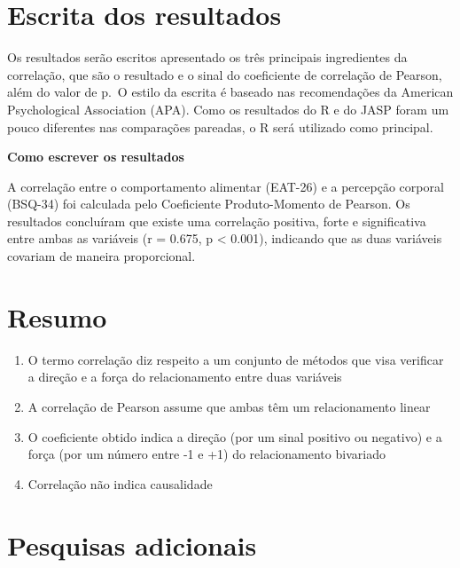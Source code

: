 \documentclass[
]{book}
\providecommand{\tightlist}{%
  \setlength{\itemsep}{0pt}\setlength{\parskip}{0pt}}
\begin{document}
\hypertarget{escrita-dos-resultados-12}{%
\section{Escrita dos resultados}\label{escrita-dos-resultados-12}}

Os resultados serão escritos apresentado os três principais ingredientes da correlação, que são o resultado e o sinal do coeficiente de correlação de Pearson, além do valor de p.~O estilo da escrita é baseado nas recomendações da American Psychological Association (APA). Como os resultados do R e do JASP foram um pouco diferentes nas comparações pareadas, o R será utilizado como principal.

\textbf{Como escrever os resultados}

A correlação entre o comportamento alimentar (EAT-26) e a percepção corporal (BSQ-34) foi calculada pelo Coeficiente Produto-Momento de Pearson. Os resultados concluíram que existe uma correlação positiva, forte e significativa entre ambas as variáveis (r = 0.675, p \textless{} 0.001), indicando que as duas variáveis covariam de maneira proporcional.

\hypertarget{resumo-14}{%
\section{Resumo}\label{resumo-14}}

\begin{enumerate}
\def\labelenumi{\arabic{enumi}.}
\tightlist
\item
  O termo correlação diz respeito a um conjunto de métodos que visa verificar a direção e a força do relacionamento entre duas variáveis\\
\item
  A correlação de Pearson assume que ambas têm um relacionamento linear\\
\item
  O coeficiente obtido indica a direção (por um sinal positivo ou negativo) e a força (por um número entre -1 e +1) do relacionamento bivariado\\
\item
  Correlação não indica causalidade\\
\end{enumerate}

\hypertarget{pesquisas-adicionais-7}{%
\section{Pesquisas adicionais}\label{pesquisas-adicionais-7}}
\end{document}
